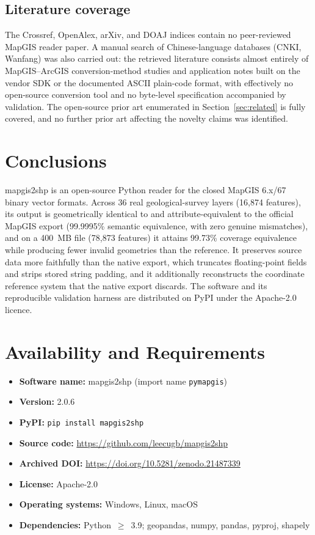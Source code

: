 \documentclass[11pt,a4paper]{article}
\begin{document}
\subsection{Literature coverage}
The Crossref, OpenAlex, arXiv, and DOAJ indices contain no peer-reviewed MapGIS reader paper. A manual search of Chinese-language databases (CNKI, Wanfang) was also carried out: the retrieved literature consists almost entirely of MapGIS--ArcGIS conversion-method studies and application notes built on the vendor SDK or the documented ASCII plain-code format, with effectively no open-source conversion tool and no byte-level specification accompanied by validation. The open-source prior art enumerated in Section~\ref{sec:related} is fully covered, and no further prior art affecting the novelty claims was identified.

\section{Conclusions}
mapgis2shp is an open-source Python reader for the closed MapGIS 6.x/67 binary vector formats. Across 36 real geological-survey layers (16{,}874 features), its output is geometrically identical to and attribute-equivalent to the official MapGIS export (99.9995\% semantic equivalence, with zero genuine mismatches), and on a 400~MB file (78{,}873 features) it attains 99.73\% coverage equivalence while producing fewer invalid geometries than the reference. It preserves source data more faithfully than the native export, which truncates floating-point fields and strips stored string padding, and it additionally reconstructs the coordinate reference system that the native export discards. The software and its reproducible validation harness are distributed on PyPI under the Apache-2.0 licence.

\section*{Availability and Requirements}
\begin{itemize}
  \item \textbf{Software name:} mapgis2shp (import name \texttt{pymapgis})
  \item \textbf{Version:} 2.0.6
  \item \textbf{PyPI:} \texttt{pip install mapgis2shp}
  \item \textbf{Source code:} \url{https://github.com/leecugb/mapgis2shp}
  \item \textbf{Archived DOI:} \url{https://doi.org/10.5281/zenodo.21487339}
  \item \textbf{License:} Apache-2.0
  \item \textbf{Operating systems:} Windows, Linux, macOS
  \item \textbf{Dependencies:} Python~$\geq$~3.9; geopandas, numpy, pandas, pyproj, shapely
\end{itemize}
\end{document}
